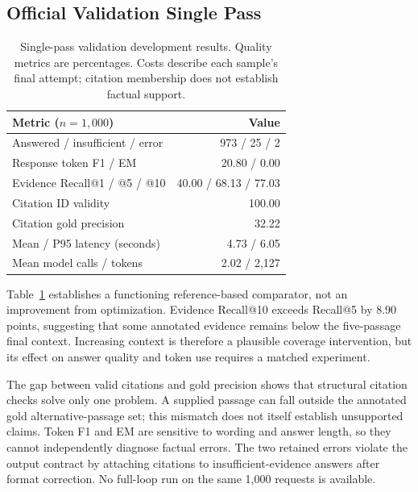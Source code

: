 \subsection{Official Validation Single Pass}
\label{sec:official-results}
\begin{table}[t]
\centering\small
\begin{tabular}{lr}
\toprule
Metric ($n=1,000$) & Value\\
\midrule
Answered / insufficient / error & 973 / 25 / 2\\
Response token F1 / EM & 20.80 / 0.00\\
Evidence Recall@1 / @5 / @10 & 40.00 / 68.13 / 77.03\\
Citation ID validity & 100.00\\
Citation gold precision & 32.22\\
Mean / P95 latency (seconds) & 4.73 / 6.05\\
Mean model calls / tokens & 2.02 / 2,127\\
\bottomrule
\end{tabular}
\caption{Single-pass validation development results. Quality metrics are percentages. Costs describe each sample's final attempt; citation membership does not establish factual support.}
\label{tab:official}
\end{table}

Table~\ref{tab:official} establishes a functioning reference-based comparator, not an improvement from optimization. Evidence Recall@10 exceeds Recall@5 by 8.90 points, suggesting that some annotated evidence remains below the five-passage final context. Increasing context is therefore a plausible coverage intervention, but its effect on answer quality and token use requires a matched experiment.

The gap between valid citations and gold precision shows that structural citation checks solve only one problem. A supplied passage can fall outside the annotated gold alternative-passage set; this mismatch does not itself establish unsupported claims. Token F1 and EM are sensitive to wording and answer length, so they cannot independently diagnose factual errors. The two retained errors violate the output contract by attaching citations to insufficient-evidence answers after format correction. No full-loop run on the same 1,000 requests is available.

